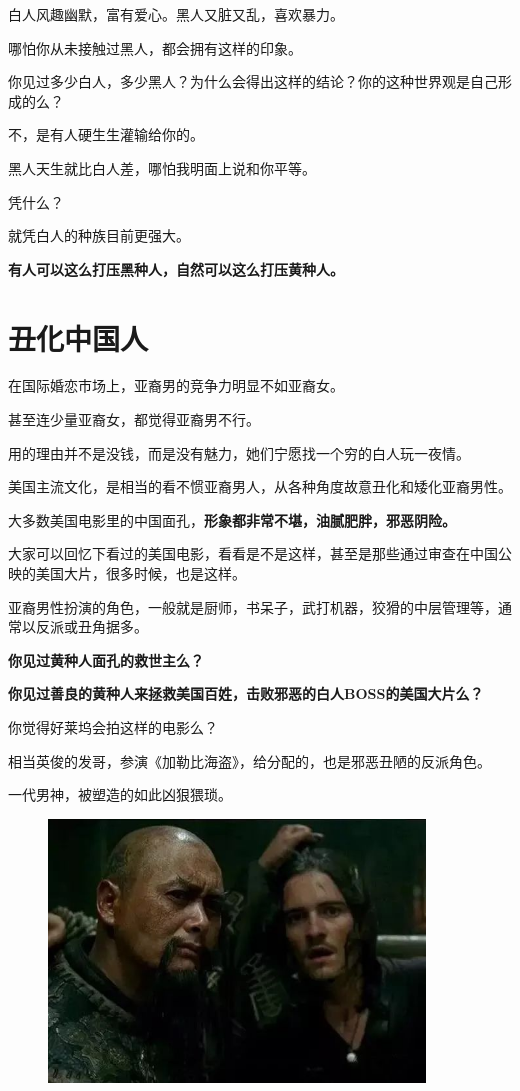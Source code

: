 \documentclass[UTF8, 11pt, oneside]{ctexart}
\newcommand{\zd}[1]{\textbf{\textcolor[RGB]{123,12,0}{#1}}} %
\newcommand{\biaoti}[1]{%
    \section*{#1}
}
\begin{document}
白人风趣幽默，富有爱心。黑人又脏又乱，喜欢暴力。

哪怕你从未接触过黑人，都会拥有这样的印象。

你见过多少白人，多少黑人？为什么会得出这样的结论？你的这种世界观是自己形成的么？

不，是有人硬生生灌输给你的。

黑人天生就比白人差，哪怕我明面上说和你平等。

凭什么？

就凭白人的种族目前更强大。

\zd{有人可以这么打压黑种人，自然可以这么打压黄种人。 }


\biaoti{丑化中国人}

在国际婚恋市场上，亚裔男的竞争力明显不如亚裔女。

甚至连少量亚裔女，都觉得亚裔男不行。

用的理由并不是没钱，而是没有魅力，她们宁愿找一个穷的白人玩一夜情。

美国主流文化，是相当的看不惯亚裔男人，从各种角度故意丑化和矮化亚裔男性。

大多数美国电影里的中国面孔，\zd{形象都非常不堪，油腻肥胖，邪恶阴险。}

大家可以回忆下看过的美国电影，看看是不是这样，甚至是那些通过审查在中国公映的美国大片，很多时候，也是这样。

亚裔男性扮演的角色，一般就是厨师，书呆子，武打机器，狡猾的中层管理等，通常以反派或丑角据多。

\zd{你见过黄种人面孔的救世主么？}

\zd{你见过善良的黄种人来拯救美国百姓，击败邪恶的白人BOSS的美国大片么？}

你觉得好莱坞会拍这样的电影么？

相当英俊的发哥，参演《加勒比海盗》，给分配的，也是邪恶丑陋的反派角色。

一代男神，被塑造的如此凶狠猥琐。

\begin{figure}[H]
    \centering
    \includegraphics[width=10cm]{2023-09-06-003.jpg}
\end{figure}
\end{document}
